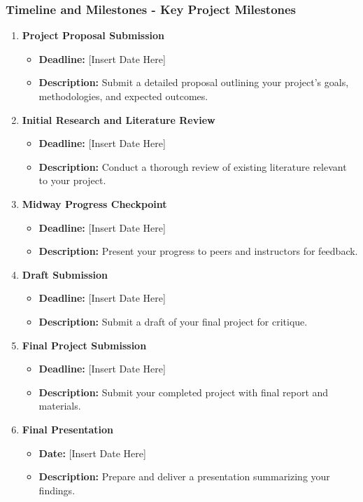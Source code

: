 \documentclass{beamer}
\begin{document}
\begin{frame}[fragile]
    \frametitle{Timeline and Milestones - Key Project Milestones}
    \begin{enumerate}
        \item \textbf{Project Proposal Submission}
        \begin{itemize}
            \item \textbf{Deadline:} [Insert Date Here]
            \item \textbf{Description:} Submit a detailed proposal outlining your project's goals, methodologies, and expected outcomes.
        \end{itemize}

        \item \textbf{Initial Research and Literature Review}
        \begin{itemize}
            \item \textbf{Deadline:} [Insert Date Here]
            \item \textbf{Description:} Conduct a thorough review of existing literature relevant to your project.
        \end{itemize}

        \item \textbf{Midway Progress Checkpoint}
        \begin{itemize}
            \item \textbf{Deadline:} [Insert Date Here]
            \item \textbf{Description:} Present your progress to peers and instructors for feedback.
        \end{itemize}

        \item \textbf{Draft Submission}
        \begin{itemize}
            \item \textbf{Deadline:} [Insert Date Here]
            \item \textbf{Description:} Submit a draft of your final project for critique.
        \end{itemize}

        \item \textbf{Final Project Submission}
        \begin{itemize}
            \item \textbf{Deadline:} [Insert Date Here]
            \item \textbf{Description:} Submit your completed project with final report and materials.
        \end{itemize}

        \item \textbf{Final Presentation}
        \begin{itemize}
            \item \textbf{Date:} [Insert Date Here]
            \item \textbf{Description:} Prepare and deliver a presentation summarizing your findings.
        \end{itemize}
    \end{enumerate}
\end{frame}
\end{document}
